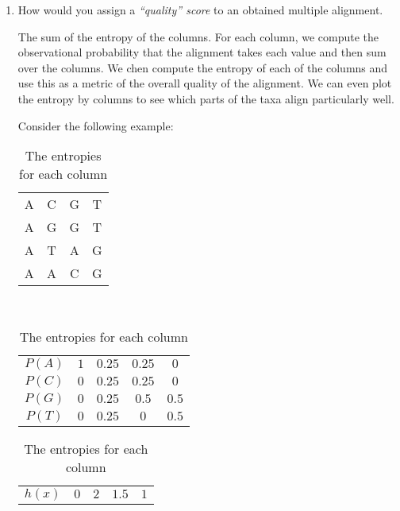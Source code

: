 \documentclass[10pt,\jkfside,a4paper]{article}
\begin{document}
\begin{enumerate}
    \item How would you assign a \textit{``quality'' score} to an obtained multiple alignment.

    The sum of the entropy of the columns. For each column, we compute the observational probability that the alignment takes each value and then sum over the columns. We chen compute the entropy of each of the
    columns and use this as a metric of the overall quality of the alignment. We can even plot the entropy by columns to see which parts of the taxa align particularly well.

    Consider the following example:

    \begin{table}[H]

        \centering

        \begin{tabular}{c|c|c|c}
            A & C & G & T \\
            A & G & G & T \\
            A & T & A & G \\
            A & A & C & G \\
        \end{tabular}

        \caption{a possible multiple alignment}~\label{tab:multiple_alignment}

        \centering

        \begin{tabular}{c|c|c|c|c}
            $P(A)$ & $1$ & $0.25$ & $0.25$ & $0$ \\
            $P(C)$ & $0$ & $0.25$ & $0.25$ & $0$ \\
            $P(G)$ & $0$ & $0.25$ & $0.5$ & $0.5$ \\
            $P(T)$ & $0$ & $0.25$ & $0$ & $0.5$ \\
        \end{tabular}

        \caption{The observational probabilities corresponding to Table~\ref{tab:multiple_alignment}}

        \centering

        \begin{tabular}{c|c|c|c|c}
            $h(x)$ & $0$ & $2$ & $1.5$ & $1$ \\
        \end{tabular}

        \caption{The entropies for each column}

    \end{table}


\end{enumerate}
\end{document}
